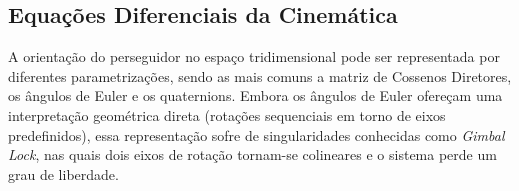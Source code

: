 \subsection{Equações Diferenciais da Cinemática}
\label{sec:equacoes_cinematica}

A orientação do perseguidor no espaço tridimensional pode ser representada por diferentes parametrizações, sendo as mais comuns a matriz de Cossenos Diretores, os ângulos de Euler e os quaternions.
Embora os ângulos de Euler ofereçam uma interpretação geométrica direta (rotações sequenciais em torno de eixos predefinidos), essa representação sofre de singularidades conhecidas como \emph{Gimbal Lock}, nas quais dois eixos de rotação tornam-se colineares e o sistema perde um grau de liberdade.












